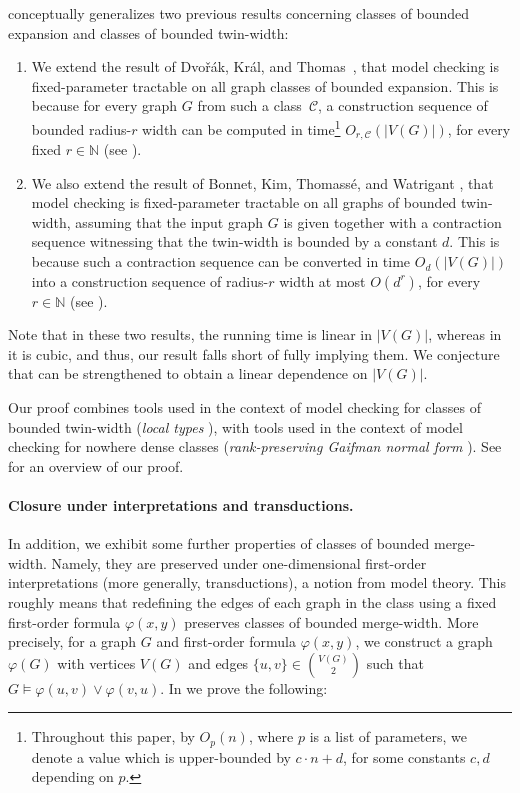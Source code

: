 \documentclass[11pt]{article}
\theoremstyle{remark}
\def\Dvorak{Dvo\v{r}\'{a}k\xspace}
\def\Kral{Kr\'{a}l\xspace}
\newcommand{\set}[1]{\{#1\}}
\def\phi{\varphi}
\def\cal{\mathcal}
\def\N{\mathbb N}
\newcommand{\CC}{\cal C}
\begin{document}
\medskip
{} conceptually generalizes two previous results concerning classes of bounded expansion and classes of bounded twin-width:
\begin{enumerate}[wide, labelwidth=!, labelindent=0pt]
  \item We extend the result of \Dvorak, \Kral, and Thomas~\cite{DvorakKT13-journal}, that model checking is fixed-parameter tractable on all graph classes of bounded expansion. This is because for every graph $G$ from such a class~$\CC$, a construction sequence of bounded radius-$r$ width can be computed in  time\footnote{Throughout this paper,
  by $O_{p}(n)$, where $p$ is a list of parameters, we denote a value which is upper-bounded by $c\cdot n+d$, for some constants $c,d$ depending on $p$.} $O_{r,\CC}(|V(G)|)$, for every fixed $r\in\N$
  (see ).

  \item We also extend the result of Bonnet, Kim, Thomass\'e, and Watrigant \cite{tww1}, that model checking is fixed-parameter tractable on all graphs of bounded twin-width, assuming that
  the input graph $G$ is given together with a contraction sequence witnessing that the twin-width is bounded by a constant $d$. This is because such a contraction sequence can be converted in time $O_d(|V(G)|)$ into a construction sequence of radius-$r$ width at most $O(d^r)$, for every $r\in\N$ (see ).
\end{enumerate}
Note that in these two results, the running time is linear in $|V(G)|$, whereas in 
it is cubic, and thus, our result falls short of fully implying them.
We conjecture that  can be strengthened to obtain a linear dependence on \(|V(G)|\).

Our proof combines tools used in the context of model checking for classes of bounded twin-width (\emph{local types} \cite{tww-types-icalp}),
with tools used in the context of model checking for nowhere dense classes (\emph{rank-preserving Gaifman normal form} \cite{gks}).
See  for an overview of our proof.


\paragraph{Closure under interpretations and transductions.}
In addition,
we exhibit some further properties of classes of bounded merge-width.
Namely, they are preserved under one-dimensional first-order interpretations (more generally, transductions), a notion from model theory.
This roughly means that redefining the edges of each graph in the class using a fixed first-order formula $\phi(x,y)$
preserves classes of bounded merge-width.
More precisely, for a graph  $G$ and first-order formula  $\phi(x,y)$,
we construct
a graph $\phi(G)$
with vertices $V(G)$ and edges $\set{u,v}\in {V(G)\choose 2}$ such that $G\models\phi(u,v)\lor\phi(v,u)$.
In  we prove the following:
\end{document}
